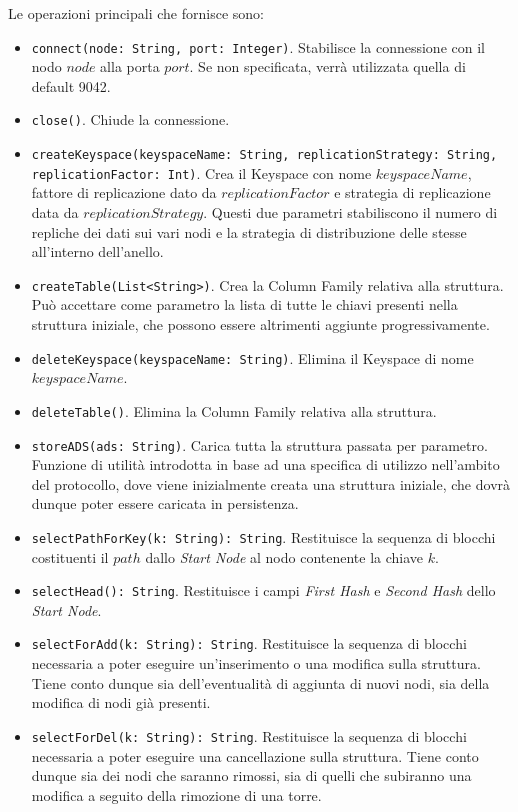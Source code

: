 		Le operazioni principali che fornisce sono:
		\begin{itemize}
			\item \verb!connect(node: String, port: Integer)!. Stabilisce la connessione con il nodo $ node $ alla porta $ port $. Se non specificata, verrà utilizzata quella di default 9042.
			\item \verb!close()!. Chiude la connessione.
			\item \verb!createKeyspace(keyspaceName: String, replicationStrategy: String, replicationFactor: Int)!. Crea il Keyspace con nome $ keyspaceName $, fattore di replicazione dato da $ replicationFactor $ e strategia di replicazione data da $ replicationStrategy $. Questi due parametri stabiliscono il numero di repliche dei dati sui vari nodi e la strategia di distribuzione delle stesse all'interno dell'anello.
			\item \verb!createTable(List<String>)!. Crea la Column Family relativa alla struttura. Può accettare come parametro la lista di tutte le chiavi presenti nella struttura iniziale, che possono essere altrimenti aggiunte progressivamente.
			\item \verb!deleteKeyspace(keyspaceName: String)!. Elimina il Keyspace di nome $ keyspaceName $.
			\item \verb!deleteTable()!. Elimina la Column Family relativa alla struttura.
			\item \verb!storeADS(ads: String)!. Carica tutta la struttura passata per parametro. Funzione di utilità introdotta in base ad una specifica di utilizzo nell'ambito del protocollo, dove viene inizialmente creata una struttura iniziale, che dovrà dunque poter essere caricata in persistenza.
			\item \verb!selectPathForKey(k: String): String!. Restituisce la sequenza di blocchi costituenti il $ path $ dallo \textit{Start Node} al nodo contenente la chiave $ k $.
			\item \verb!selectHead(): String!. Restituisce i campi \textit{First Hash} e \textit{Second Hash} dello \textit{Start Node}.
			\item \verb!selectForAdd(k: String): String!. Restituisce la sequenza di blocchi necessaria a poter eseguire un'inserimento o una modifica sulla struttura. Tiene conto dunque sia dell'eventualità di aggiunta di nuovi nodi, sia della modifica di nodi già presenti.
			\item \verb!selectForDel(k: String): String!. Restituisce la sequenza di blocchi necessaria a poter eseguire una cancellazione sulla struttura. Tiene conto dunque sia dei nodi che saranno rimossi, sia di quelli che subiranno una modifica a seguito della rimozione di una torre.

\end{itemize}
